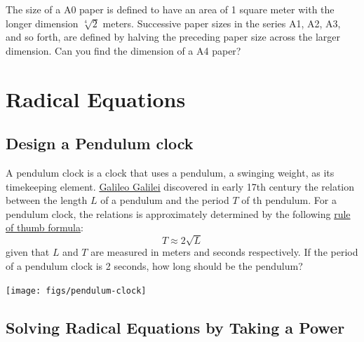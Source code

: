 \documentclass[
  en,11pt]{elegantbook}
\newcommand{\size}[2]{{\fontsize{#1}{0}\selectfont#2}}
\renewenvironment{exercise}[1][]{
    \refstepcounter{exer}
    \par\noindent
    \makebox[-3pt][r]{\color{red!90}\size{12}{\HandPencilLeft}}
	\textbf{\color{main}{\exercisename} \theexer #1}
    \rmfamily
}{\par\ignorespacesafterend}
\newenvironment{rmdthink}{
	\vspace*{0.5\baselineskip}
	\par\noindent
	\makebox[-4pt][r]{\color{green!90}\size{12}{\faLightbulbO}\,\,}
    \begin{tcolorbox}[
    enhanced,
    title={\textbf{\color{second}Think}},
    title style={left color=blue!10!green!20!white,right color=yellow!20!blue!20!white},
    colback=green!20!white,
    ]
    \sffamily
}{
    \end{tcolorbox}
	\par\ignorespacesafterend
}
\begin{document}
\begin{exercise}
The size of a A0 paper is defined to have an area of 1 square meter with the longer dimension \(\sqrt[4]{2}\) meters. Successive paper sizes in the series A1, A2, A3, and so forth, are defined by halving the preceding paper size across the larger dimension. Can you find the dimension of a A4 paper?
\end{exercise}

\hypertarget{radical-equations}{%
\chapter{Radical Equations}\label{radical-equations}}

\hypertarget{design-a-pendulum-clock}{%
\section{Design a Pendulum clock}\label{design-a-pendulum-clock}}

\begin{rmdthink}

\begin{multicols}{2}

A pendulum clock is a clock that uses a pendulum, a swinging weight, as its timekeeping element. \href{https://en.wikipedia.org/wiki/Galileo_Galilei}{Galileo Galilei} discovered in early 17th century the relation between the length \(L\) of a pendulum and the period \(T\) of th pendulum. For a pendulum clock, the relations is approximately determined by the following \href{https://en.wikipedia.org/wiki/Pendulum_(mathematics)}{rule of thumb formula}:
\[
T\approx 2\sqrt{L}
\]
given that \(L\) and \(T\) are measured in meters and seconds respectively. If the period of a pendulum clock is 2 seconds, how long should be the pendulum?

\begin{center}\texttt{[image: figs/pendulum-clock]} \end{center}

\end{multicols}

\end{rmdthink}

\hypertarget{solving-radical-equations-by-taking-a-power}{%
\section{Solving Radical Equations by Taking a Power}\label{solving-radical-equations-by-taking-a-power}}
\end{document}
